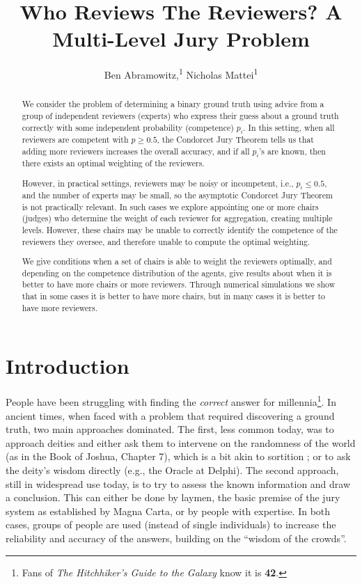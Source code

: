 \documentclass[letterpaper]{article} %
\title{Who Reviews The Reviewers? A Multi-Level Jury Problem}
\author{
 Ben Abramowitz,\textsuperscript{\rm 1} Nicholas Mattei\textsuperscript{\rm 1}
}
\newcommand{\nickin}[1]{\todo[color=kentuckyblue!40,inline]{Nick says: #1}}
\begin{document}
\maketitle

\begin{abstract}
We consider the problem of determining a binary ground truth using advice from a group of independent reviewers (experts) who express their guess about a ground truth correctly with some independent probability (competence) $p_i$. In this setting, when all reviewers are competent with $p \geq 0.5$, the Condorcet Jury Theorem tells us that adding more reviewers increases the overall accuracy, and if all $p_i$'s are known, then there exists an optimal weighting of the reviewers.

However, in practical settings, reviewers may be noisy or incompetent, i.e., $p_i \leq 0.5$, and the number of experts may be small, so the asymptotic Condorcet Jury Theorem is not practically relevant. In such cases we explore appointing one or more chairs (judges) who determine the weight of each reviewer for aggregation, creating multiple levels. However, these chairs may be unable to correctly identify the competence of the reviewers they oversee, and therefore unable to compute the optimal weighting.

We give conditions when a set of chairs is able to weight the reviewers optimally, and depending on the competence distribution of the agents, give results about when it is better to have more chairs or more reviewers. Through numerical simulations we show that in some cases it is better to have more chairs, but in many cases it is better to have more reviewers.
\end{abstract}


\section{Introduction}
People have been struggling with finding the \emph{correct} answer for millennia\footnote{Fans of \emph{The Hitchhiker's Guide to the Galaxy} know it is \textbf{42}.}. %
In ancient times, when faced with a problem that required discovering a ground truth, two main approaches dominated. The first, less common today, was to approach deities and either ask them to intervene on the randomness of the world (as in the Book of Joshua, Chapter 7), which is a bit akin to sortition \cite{FGGHP21}; or to ask the deity's wisdom directly (e.g., the Oracle at Delphi). The second approach, still in widespread use today, is to try to assess the known information and draw a conclusion. This can either be done by laymen, the basic premise of the jury system as established by Magna Carta, or by people with expertise. In both cases, groups of people are used (instead of single individuals) to increase the reliability and accuracy of the answers, building on the ``wisdom of the crowds''.
\end{document}

